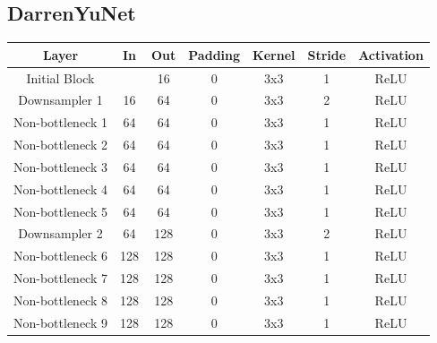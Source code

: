 \subsection*{DarrenYuNet}
\begin{table}[htbp]
	\centering
	\label{tab:darrenyu}
	\setlength{\abovecaptionskip}{10pt}
	\begin{tabular}{|c|c|c|c|c|c|c|}
		\hline
		\textbf{Layer}    & \textbf{In} & \textbf{Out} & \textbf{Padding} & \textbf{Kernel} & \textbf{Stride} & \textbf{Activation} \\ \hline
		Initial Block     &             & 16           & 0                & 3x3             & 1               & ReLU                \\ \hline
		Downsampler 1     & 16          & 64           & 0                & 3x3             & 2               & ReLU                \\ \hline
		Non-bottleneck 1  & 64          & 64           & 0                & 3x3             & 1               & ReLU                \\ \hline
		Non-bottleneck 2  & 64          & 64           & 0                & 3x3             & 1               & ReLU                \\ \hline
		Non-bottleneck 3  & 64          & 64           & 0                & 3x3             & 1               & ReLU                \\ \hline
		Non-bottleneck 4  & 64          & 64           & 0                & 3x3             & 1               & ReLU                \\ \hline
		Non-bottleneck 5  & 64          & 64           & 0                & 3x3             & 1               & ReLU                \\ \hline
		Downsampler 2     & 64          & 128          & 0                & 3x3             & 2               & ReLU                \\ \hline
		Non-bottleneck 6  & 128         & 128          & 0                & 3x3             & 1               & ReLU                \\ \hline
		Non-bottleneck 7  & 128         & 128          & 0                & 3x3             & 1               & ReLU                \\ \hline
		Non-bottleneck 8  & 128         & 128          & 0                & 3x3             & 1               & ReLU                \\ \hline
		Non-bottleneck 9  & 128         & 128          & 0                & 3x3             & 1               & ReLU                \\ \hline

\end{tabular}
\end{table}
